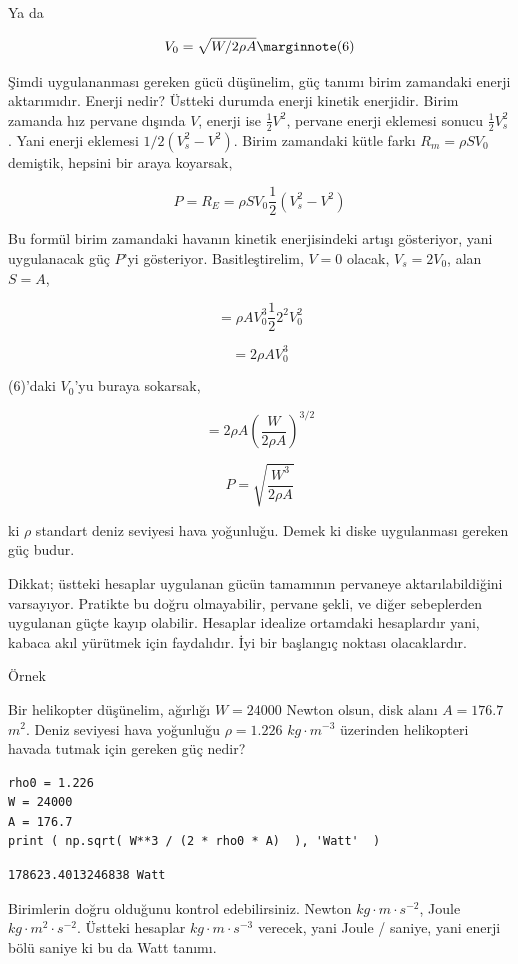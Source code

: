 \documentclass[12pt,fleqn]{article}\usepackage{../../common}
\begin{document}
Ya da

$$
V_0 = \sqrt{W / 2 \rho A} 
\mlabel{6}
$$

Şimdi uygulananması gereken gücü düşünelim, güç tanımı birim zamandaki
enerji aktarımıdır. Enerji nedir? Üstteki durumda enerji kinetik enerjidir.
Birim zamanda hız pervane dışında $V$, enerji ise $\frac{1}{2}V^2$, pervane
enerji eklemesi sonucu $\frac{1}{2} V_s^2$. Yani enerji eklemesi
$1/2(V_s^2 - V^2)$. Birim zamandaki kütle farkı $R_m = \rho S V_0$
demiştik, hepsini bir araya koyarsak,

$$
P = R_E = \rho S V_0 \frac{1}{2} (V_s^2 - V^2)
$$

Bu formül birim zamandaki havanın kinetik enerjisindeki artışı gösteriyor,
yani uygulanacak güç $P$'yi gösteriyor. Basitleştirelim, $V=0$ olacak,
$V_s = 2 V_0$, alan $S=A$,

$$
= \rho A V_0^3 \frac{1}{2} 2^2 V_0^2
$$

$$
= 2 \rho A V_0^3
$$

(6)'daki $V_0$'yu buraya sokarsak,

$$
= 2 \rho A \left( \frac{W}{ 2 \rho A} \right)^{3/2}
$$

$$
P = \sqrt{ \frac{W^3}{2 \rho A} }
$$

ki $\rho$ standart deniz seviyesi hava yoğunluğu. Demek ki diske
uygulanması gereken güç budur.

Dikkat; üstteki hesaplar uygulanan gücün tamamının pervaneye
aktarılabildiğini varsayıyor. Pratikte bu doğru olmayabilir, pervane şekli,
ve diğer sebeplerden uygulanan güçte kayıp olabilir. Hesaplar idealize
ortamdaki hesaplardır yani, kabaca akıl yürütmek için faydalıdır. İyi bir
başlangıç noktası olacaklardır.

Örnek

Bir helikopter düşünelim, ağırlığı $W = 24000$ Newton olsun, disk alanı
$A = 176.7$ $m^2$. Deniz seviyesi hava yoğunluğu $\rho = 1.226$
$kg \cdot m^{-3}$ üzerinden helikopteri havada tutmak için gereken güç
nedir?

\begin{verbatim}
rho0 = 1.226
W = 24000
A = 176.7
print ( np.sqrt( W**3 / (2 * rho0 * A)  ), 'Watt'  )  
\end{verbatim}

\begin{verbatim}
178623.4013246838 Watt
\end{verbatim}

Birimlerin doğru olduğunu kontrol edebilirsiniz. Newton $kg \cdot m \cdot
s^{-2}$, Joule $kg \cdot m^2 \cdot s^{-2}$. Üstteki hesaplar $kg \cdot m
\cdot s^{-3}$ verecek, yani Joule / saniye, yani enerji bölü saniye ki bu
da Watt tanımı. 
\end{document}
